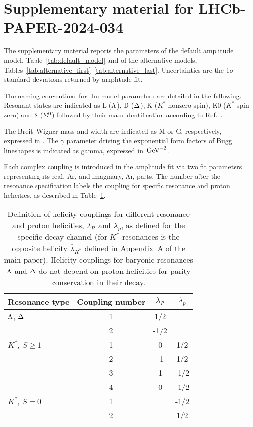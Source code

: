 \clearpage
\section*{Supplementary material for LHCb-PAPER-2024-034}

The supplementary material reports the parameters of the default amplitude model, Table~\ref{tab:default_model} and of the alternative models, Tables~\ref{tab:alternative_first}--\ref{tab:alternative_last}. Uncertainties are the 1$\sigma$ standard deviations returned by amplitude fit.

The naming conventions for the model parameters are detailed in the following.
Resonant states are indicated as L (${\Lambda}$), D (${\Delta}$), K ($K^*$ nonzero spin), K0 ($K^*$ spin zero) and S (${{\Sigma}{}^0}$) followed by their mass identification according to Ref.~\cite{PDG2024}.

The Breit--Wigner mass and width are indicated as M or G, respectively, expressed in \gev. The $\gamma$ parameter driving the exponential form factors of Bugg lineshapes is indicated as gamma, expressed in $\text{\,Ge\kern -0.1em V}^{-2}$.

Each complex coupling is introduced in the amplitude fit via two fit parameters representing its real, Ar, and imaginary, Ai, parts. The number after the resonance specification labels the coupling for specific resonance and proton helicities, as described in Table~\ref{tab:helicity_coupling definition}.

\begin{table}[h]
\centering
\caption{Definition of helicity couplings for different resonance and proton helicities, $\lambda_R$ and $\lambda_p$, as defined for the specific decay channel (\eg for $K^*$ resonances is the opposite helicity $\bar{\lambda}_{K^*}$ defined in Appendix~A of the main paper). Helicity couplings for baryonic resonances ${\Lambda}$ and ${\Delta}$ do not depend on proton helicities for parity conservation in their decay.\label{tab:helicity_coupling definition}}
\begin{tabular}{lccc}
\toprule
Resonance type & Coupling number & $\lambda_R$ & $\lambda_p$\\
\midrule
${\Lambda}$, ${\Delta}$  & 1 & \phantom{-}1/2 & \\
& 2 & -1/2 & \\
\midrule
$K^*$, $S\geq 1$ & 1 & 0 & \phantom{-}1/2 \\
& 2 & -1 & \phantom{-}1/2 \\
& 3 & 1 & -1/2 \\
& 4 & 0 & -1/2 \\
\midrule
$K^*$, $S=0$ & 1 &  & -1/2 \\
& 2 &  & \phantom{-}1/2 \\
\bottomrule
\end{tabular}
\end{table}

